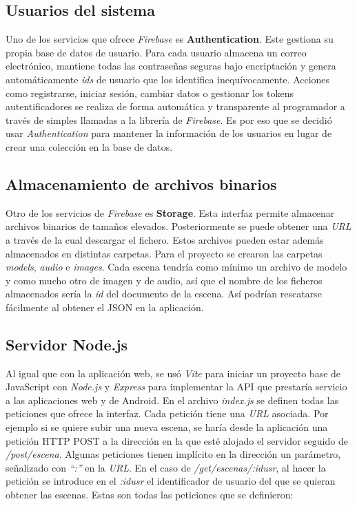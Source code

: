 \subsection{Usuarios del sistema}

Uno de los servicios que ofrece \textit{Firebase} es \textbf{Authentication}. Este gestiona su propia base de datos de usuario. Para cada usuario almacena un correo electrónico, mantiene todas las contraseñas seguras bajo encriptación y genera automáticamente \textit{ids} de usuario que los identifica inequívocamente. Acciones como registrarse, iniciar sesión, cambiar datos o gestionar los tokens autentificadores se realiza de forma automática y transparente al programador a través de simples llamadas a la librería de \textit{Firebase}. Es por eso que se decidió usar \textit{Authentication} para mantener la información de los usuarios en lugar de crear una colección en la base de datos.

\subsection{Almacenamiento de archivos binarios}

Otro de los servicios de \textit{Firebase} es \textbf{Storage}. Esta interfaz permite almacenar archivos binarios de tamaños elevados. Posteriormente se puede obtener una \textit{URL} a través de la cual descargar el fichero. Estos archivos pueden estar además almacenados en distintas carpetas. Para el proyecto se crearon las carpetas \textit{models}, \textit{audio} e \textit{images}. Cada escena tendría como mínimo un archivo de modelo y como mucho otro de imagen y de audio, así que el nombre de los ficheros almacenados sería la \textit{id} del documento de la escena. Así podrían rescatarse fácilmente al obtener el JSON en la aplicación.

\subsection{Servidor Node.js}

Al igual que con la aplicación web, se usó \textit{Vite} para iniciar un proyecto base de JavaScript con \textit{Node.js}\cite{nodejs} y \textit{Express}\cite{express} para implementar la API que prestaría servicio a las aplicaciones web y de Android. En el archivo \textit{index.js} se definen todas las peticiones que ofrece la interfaz. Cada petición tiene una \textit{URL} asociada. Por ejemplo si se quiere subir una nueva escena, se haría desde la aplicación una petición HTTP POST a la dirección en la que esté alojado el servidor seguido de \textit{/post/escena}. Algunas peticiones tienen implícito en la dirección un parámetro, señalizado con \textit{``:''} en la \textit{URL}. En el caso de \textit{/get/escenas/:idusr}, al hacer la petición se introduce en el \textit{:idusr} el identificador de usuario del que se quieran obtener las escenas. Estas son todas las peticiones que se definieron:

